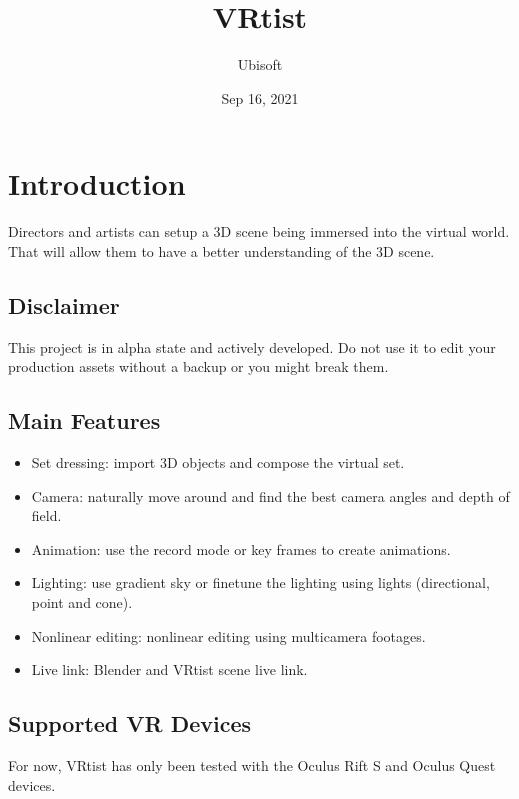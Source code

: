 \documentclass[letterpaper,10pt,english,openany,oneside]{sphinxmanual}
\title{VRtist}
\date{Sep 16, 2021}
\author{Ubisoft}
\begin{document}
\pagestyle{empty}
\sphinxmaketitle
\pagestyle{plain}
\sphinxtableofcontents
\pagestyle{normal}
\label{\detokenize{index::doc}}



\chapter{Introduction}
\label{\detokenize{index:introduction}}
\sphinxAtStartPar
Directors and artists can setup a 3D scene being immersed into the virtual world.
That will allow them to have a better understanding of the 3D scene.


\section{Disclaimer}
\label{\detokenize{index:disclaimer}}
\sphinxAtStartPar
This project is in alpha state and actively developed. Do not use it to edit your production assets without a backup or you might break them.


\section{Main Features}
\label{\detokenize{index:main-features}}\begin{itemize}
\item {} 
\sphinxAtStartPar
Set dressing: import 3D objects and compose the virtual set.

\item {} 
\sphinxAtStartPar
Camera: naturally move around and find the best camera angles and depth of field.

\item {} 
\sphinxAtStartPar
Animation: use the record mode or key frames to create animations.

\item {} 
\sphinxAtStartPar
Lighting: use gradient sky or fine\sphinxhyphen{}tune the lighting using lights (directional, point and cone).

\item {} 
\sphinxAtStartPar
Nonlinear editing: nonlinear editing using multi\sphinxhyphen{}camera footages.

\item {} 
\sphinxAtStartPar
Live link: Blender and VRtist scene live link.

\end{itemize}


\section{Supported VR Devices}
\label{\detokenize{index:supported-vr-devices}}
\sphinxAtStartPar
For now, VRtist has only been tested with the Oculus Rift S and Oculus Quest devices.
\end{document}
